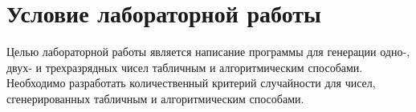 \chapter*{Условие лабораторной работы}

Целью лабораторной работы является написание программы для генерации одно-, двух- и трехразрядных чисел табличным и алгоритмическим способами.
Необходимо разработать количественный критерий случайности для чисел, сгенерированных табличным и алгоритмическим способами.